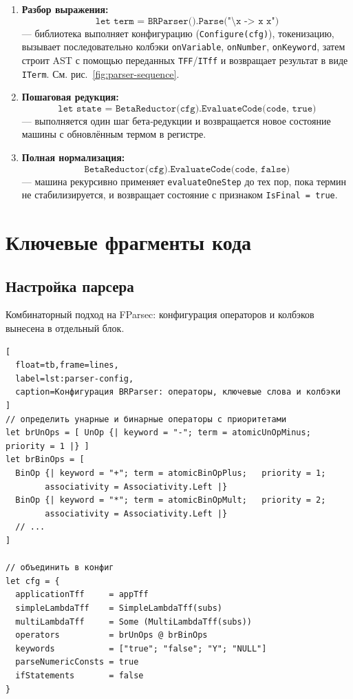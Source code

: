 \begin{itemize}
\begin{enumerate}
  \item \textbf{Разбор выражения:} 
    \[
      \texttt{let term = BRParser().Parse("\textbackslash x -> x x")}
    \]
    — библиотека выполняет конфигурацию (\texttt{Configure(cfg)}), токенизацию, вызывает последовательно колбэки \texttt{onVariable}, \texttt{onNumber}, \texttt{onKeyword}, затем строит AST с помощью переданных \texttt{TFF}/\texttt{ITff} и возвращает результат в виде \texttt{ITerm}. См. рис.~\ref{fig:parser-sequence}.

  \item \textbf{Пошаговая редукция:} 
    \[
      \texttt{let state = BetaReductor(cfg).EvaluateCode(code, true)}
    \]
    — выполняется один шаг бета‑редукции и возвращается новое состояние машины с обновлённым термом в регистре.

  \item \textbf{Полная нормализация:} 
    \[
      \texttt{BetaReductor(cfg).EvaluateCode(code, false)}
    \]
    — машина рекурсивно применяет \texttt{evaluateOneStep} до тех пор, пока термин не стабилизируется, и возвращает состояние с признаком \texttt{IsFinal = true}.
\end{enumerate}


\section{Ключевые фрагменты кода}

\subsection{Настройка парсера}
Комбинаторный подход на FParsec: конфигурация операторов и колбэков вынесена в отдельный блок.

\begin{lstlisting}[
  float=tb,frame=lines,
  label=lst:parser-config,
  caption=Конфигурация BRParser: операторы, ключевые слова и колбэки
]
// определить унарные и бинарные операторы с приоритетами
let brUnOps = [ UnOp {| keyword = "-"; term = atomicUnOpMinus; priority = 1 |} ]
let brBinOps = [
  BinOp {| keyword = "+"; term = atomicBinOpPlus;   priority = 1; 
        associativity = Associativity.Left |}
  BinOp {| keyword = "*"; term = atomicBinOpMult;   priority = 2; 
        associativity = Associativity.Left |}
  // ...
]

// объединить в конфиг
let cfg = {
  applicationTff     = appTff
  simpleLambdaTff    = SimpleLambdaTff(subs)
  multiLambdaTff     = Some (MultiLambdaTff(subs))
  operators          = brUnOps @ brBinOps
  keywords           = ["true"; "false"; "Y"; "NULL"]
  parseNumericConsts = true
  ifStatements       = false
}


\end{lstlisting}
\end{itemize}
